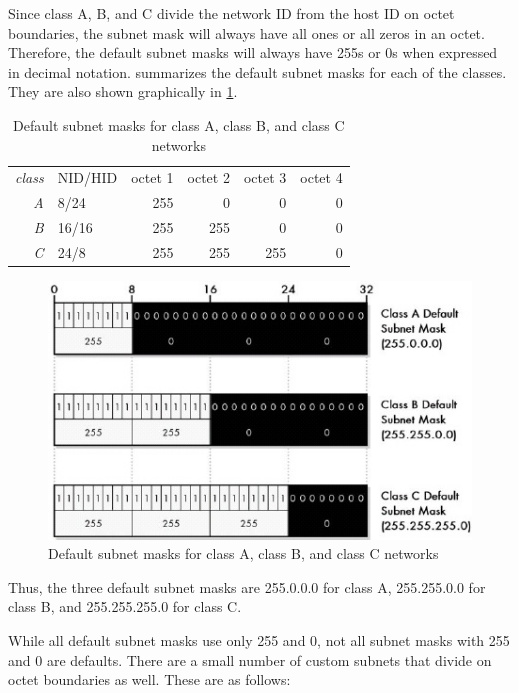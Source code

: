 Since class A, B, and C divide the network ID from the host ID on octet
boundaries, the subnet mask will always have all ones or all zeros in an
octet. Therefore, the default subnet masks will always have 255s or 0s
when expressed in decimal notation.
 summarizes the default subnet masks for each of the classes.
They are also shown graphically in \cref{fig:default-subnet-masks}.


\begin{table}
   \centering
   \begin{tabular}{rlrrrr}
   \textit{class} & NID/HID & octet 1 & octet 2 & octet 3 & octet 4 \\[1ex]
   \textit{A}     & 8/24    & 255     & 0       & 0       & 0       \\
   \textit{B}     & 16/16   & 255     & 255     & 0       & 0       \\
   \textit{C}     & 24/8    & 255     & 255     & 255     & 0       \\
   \end{tabular}
   \caption{Default subnet masks for class A, class B, and class C networks}
   \label{tab:default-subnet-masks}
\end{table}


\begin{figure}
   \centering
   \includegraphics[width=.7\textwidth]{images/default-subnet-masks.jpg}
   \caption{Default subnet masks for class A, class B, and class C networks}
   \label{fig:default-subnet-masks}
\end{figure}

Thus, the three default subnet masks are 255.0.0.0 for class A, 255.255.0.0 for class B, and 255.255.255.0 for class C.

While all default subnet masks use only 255 and 0, not all subnet masks with 255 and 0 are defaults.
There are a small number of custom subnets that divide on octet boundaries as well. These are as follows:

